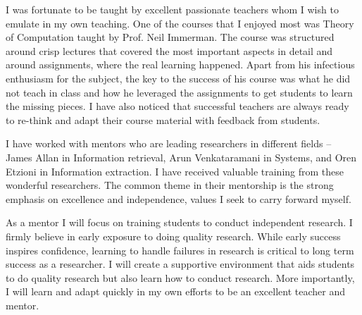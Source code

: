 \documentclass[a4paper,11pt,onecolumn]{article}
\begin{document}
I was fortunate to be taught by excellent passionate teachers whom I wish to emulate in my own teaching. One of the courses that I enjoyed most was Theory of Computation taught by Prof. Neil Immerman. The course was structured around crisp lectures that covered the most important aspects in detail and around assignments, where the real learning happened. Apart from his infectious enthusiasm for the subject, the key to the success of his course was what he did not teach in class and how he leveraged the assignments to get students to learn the missing pieces. I have also noticed that successful teachers are always ready to re-think and adapt their course material with feedback from students. 

I have worked with mentors who are leading researchers in different fields -- James Allan in Information retrieval, Arun Venkataramani in Systems, and Oren Etzioni in Information extraction. I have received valuable training from these wonderful researchers. The common theme in their mentorship is the strong emphasis on excellence and independence, values I seek to carry forward myself. 

As a mentor I will focus on training students to conduct independent research. I firmly believe in early exposure to doing quality research. While early success inspires confidence, learning to handle failures in research is critical to long term success as a researcher. I will create a supportive environment that aids students to do quality research but also learn how to conduct research. More importantly, I will learn and adapt quickly in my own efforts to be an excellent teacher and mentor.
\end{document}
